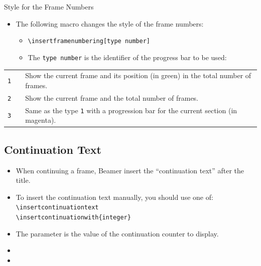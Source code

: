 \documentclass[english,sectioncirclenumberstyle]{ciadbeamer}
\begin{document}
\begin{frame}[label=progressbartypes,t]{Style for the Frame Numbers}
	\begin{itemize}
	\item The following macro changes the style of the frame numbers:
		\begin{itemize}
		\item \texttt{{\textbackslash}insertframenumbering[type number]}
		\item The \texttt{type number} is the identifier of the progress bar to be used:
		\end{itemize}
	\end{itemize}
	\begin{tabularx}{\linewidth}{|c|c|X|}
	\hline
	\tabularheading\chead{Type number} & \chead{Output} & \chead{Explanation} \\
	\hline
	\texttt{1} & \insertframenumbering[1] & Show the current frame and its position (in green) in the total number of frames. \\
	\hline
	\texttt{2} & \colorbox{CIADdarkgray}{\tiny\insertframenumbering[2]} & Show the current frame and the total number of frames. \\
	\hline
	\texttt{3} & \insertframenumbering[3] & Same as the type \texttt{1} with a progression bar for the current section (in magenta). \\
	\hline
	\end{tabularx}
\end{frame}

\subsection{Continuation Text}
\begin{frame}{\subsecname}
	\begin{itemize}
	\item When continuing a frame, Beamer insert the ``continuation text'' after the title.
	\vfill
	\item To insert the continuation text manually, you should use one of:
		\texttt{{\textbackslash}insertcontinuationtext} \\
		\texttt{{\textbackslash}insertcontinuationwith\{integer\}}
	\item The parameter is the value of the continuation counter to display.
	\vfill
	\item {}
	\item {}
	\end{itemize}
\end{frame}
\end{document}
